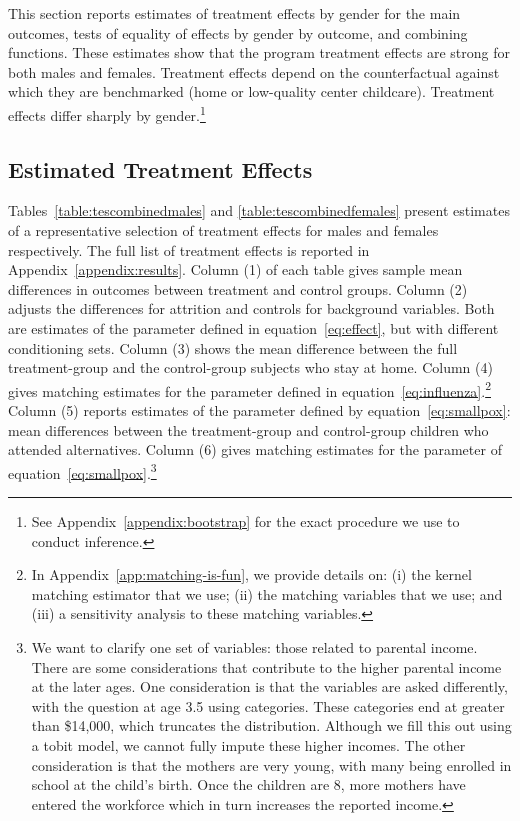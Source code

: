 This section reports estimates of treatment effects by gender for the main outcomes, tests of equality of effects by gender by outcome, and combining functions. These estimates show that the program treatment effects are strong for both males and females. Treatment effects depend on the counterfactual against which they are benchmarked (home or low-quality center childcare). Treatment effects differ sharply by gender.\footnote{See Appendix~\ref{appendix:bootstrap} for the exact procedure we use to conduct inference.}

\subsection{Estimated Treatment Effects}

Tables~\ref{table:tescombinedmales} and \ref{table:tescombinedfemales} present estimates of a representative selection of treatment effects for males and females respectively. The full list of treatment effects is reported in Appendix~\ref{appendix:results}. Column (1) of each table gives sample mean differences in outcomes between treatment and control groups. Column (2) adjusts the differences for attrition and controls for background variables. Both are estimates of the parameter defined in equation~\eqref{eq:effect}, but with different conditioning sets. Column (3) shows the mean difference between the full treatment-group and the control-group subjects who stay at home. Column (4) gives matching estimates for the parameter defined in equation~\eqref{eq:influenza}.\footnote{In Appendix~\ref{app:matching-is-fun}, we provide details on: (i) the kernel matching estimator that we use; (ii) the matching variables that we use; and (iii) a sensitivity analysis to these matching variables.} Column (5) reports estimates of the parameter defined by equation~\eqref{eq:smallpox}: mean differences between the treatment-group and control-group children who attended alternatives. Column (6) gives matching estimates for the parameter of equation~\eqref{eq:smallpox}.\footnote{We want to clarify one set of variables: those related to parental income. There are some considerations that contribute to the higher parental income at the later ages. One consideration is that the variables are asked differently, with the question at age 3.5 using categories. These categories end at greater than \$14,000, which truncates the distribution. Although we fill this out using a tobit model, we cannot fully impute these higher incomes. The other consideration is that the mothers are very young, with many being enrolled in school at the child's birth. Once the children are 8, more mothers have entered the workforce which in turn increases the reported income.}

